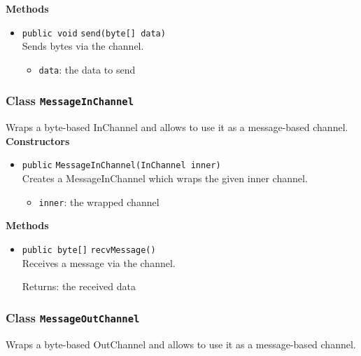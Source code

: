 \textbf{Methods}
\begin{itemize}
\item \lstinline|public void| \lstinline|send|\lstinline|(byte[] data)|\\
Sends bytes via the channel.
\begin{itemize}
\item \lstinline|data|: the data to send
\end{itemize}



\end{itemize}

\subsubsection{Class \lstinline|MessageInChannel|}
Wraps a byte-based InChannel and allows to use it as a message-based
 channel. \\




\textbf{Constructors}
\begin{itemize}
\item \lstinline|public| \lstinline|MessageInChannel|\lstinline|(InChannel inner)|\\
Creates a MessageInChannel which wraps the given inner channel.
\begin{itemize}
\item \lstinline|inner|: the wrapped channel
\end{itemize}



\end{itemize}


\textbf{Methods}
\begin{itemize}
\item \lstinline|public byte[]| \lstinline|recvMessage|\lstinline|()|\\
Receives a message via the channel.

Returns: the received data

\end{itemize}

\subsubsection{Class \lstinline|MessageOutChannel|}
Wraps a byte-based OutChannel and allows to use it as a message-based
 channel. \\




